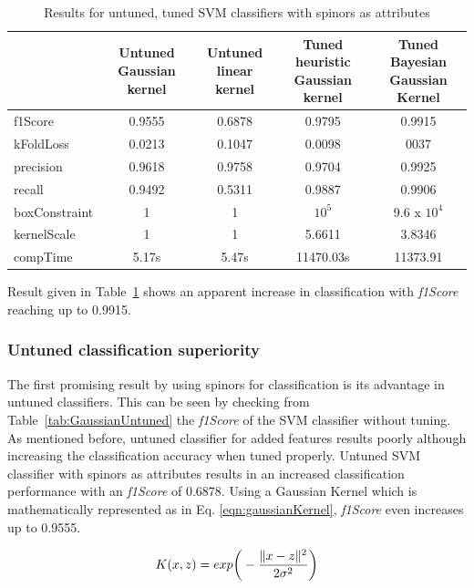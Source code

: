 \begin{table}[hbt!]
\caption{\label{tab:spinorsGaussian} Results for untuned, tuned SVM classifiers with spinors as attributes}
\centering
\begin{tabular}{lcccc}
\hline
& \makecell{Untuned \\ Gaussian kernel} & \makecell{Untuned \\ linear kernel} & \makecell{Tuned heuristic \\ Gaussian kernel}& \makecell{Tuned Bayesian \\ Gaussian Kernel}\\\hline
f1Score& 0.9555 & 0.6878 & 0.9795 & 0.9915\\
kFoldLoss & 0.0213 & 0.1047 & 0.0098 & 0037 \\
precision& 0.9618 & 0.9758 & 0.9704 & 0.9925\\
recall& 0.9492 & 0.5311 & 0.9887 & 0.9906\\
boxConstraint& 1 & 1 & $10^{5}$ & 9.6 x $10^{4}$ \\
kernelScale& 1 & 1 & 5.6611 & 3.8346 \\
compTime & 5.17s& 5.47s &11470.03s& 11373.91\\
\hline
\end{tabular}
\end{table}

Result given in Table~\ref{tab:spinorsGaussian} shows an apparent increase in classification with \emph{f1Score} reaching up to 0.9915.

\subsubsection{Untuned classification superiority}

The first promising result by using spinors for classification is its advantage in untuned classifiers. This can be seen by checking from Table~\ref{tab:GaussianUntuned} the \emph{f1Score} of the SVM classifier without tuning. As mentioned before, untuned classifier for added features results poorly although increasing the classification accuracy when tuned properly. Untuned SVM classifier with spinors as attributes results in an increased classification performance with an \emph{f1Score} of 0.6878. Using a Gaussian Kernel which is mathematically represented as in Eq. \ref{eqn:gaussianKernel}, \emph{f1Score} even increases up to 0.9555.

\begin{equation}{\label{eqn:gaussianKernel}}
K (x,z) = exp \bigg(-\frac{\Vert x - z \Vert ^ 2}{2 \sigma^2} \bigg)
\end{equation}


